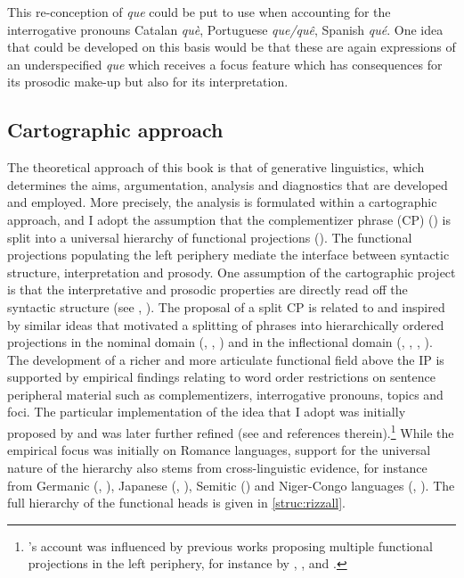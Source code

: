 This re-conception of \emph{que} could be put to use when accounting for the  interrogative pronouns Catalan \emph{què}, Portuguese \emph{que/quê}, Spanish \emph{qué}. One idea that could be developed on this basis would be that these are again expressions of an underspecified \emph{que} which receives a focus feature which has  consequences for its prosodic make-up  but also for its interpretation. 


\subsection{Cartographic approach}
\begin{sloppypar}
The theoretical approach of this book is that of generative linguistics, which determines the aims, argumentation, analysis and diagnostics that are developed and employed.  More precisely, the analysis is formulated within a cartographic approach, and  I adopt the assumption that the complementizer phrase (CP) (\citealt{Chomsky1986}) is split into a universal hierarchy of functional projections (\citealt{Rizzi1997}). The functional projections populating the left periphery mediate the interface between syntactic structure, interpretation and prosody. One assumption  of the cartographic project is that the interpretative and prosodic properties are directly read off the syntactic structure (see \citealt{Belletti2004}, \citealt{Bocci2009}). The proposal of a split CP is related to and inspired by similar ideas that motivated a splitting of phrases into hierarchically ordered projections  in the nominal  domain (\citealt{Abney1987}, \citealt{Cinque1994}, \citealt{Longobardi1996}) and in the inflectional domain (\citealt{Pollock1989}, \citealt{Belletti1990}, \citealt{Ouhalla1991}, \citealt{Cinque1999}). The  development of a richer and more articulate functional field above the IP is supported by empirical findings relating to word order restrictions on sentence peripheral material such as complementizers, interrogative pronouns, topics and foci.  The particular implementation of the idea that I adopt was initially proposed by \citet{Rizzi1997} and was later further refined (see \citealt{Rizzi2001,Rizzi2004a,Rizzi2013} and references therein).\footnote{\citeauthor{Rizzi1997}'s account was influenced by previous works proposing multiple functional projections in the left periphery,  for instance by \citet{Reinhart1981}, \citet{Uriagereka1988, Uriagereka1995},   \citet{Brody1990, Brody1995} and \citet{Culicover1992}.}
While the empirical focus was initially on Romance languages,  support for the universal nature of the hierarchy also stems  from cross-linguistic evidence, for instance from  Germanic (\citealt{Grewendorf2002}, \citealt{Haegeman2004,Haegeman2006,Haegeman2012}), Japanese (\citealt{Saito2012}, \citealt{Belletti2013}), Semitic (\citealt{Shlonsky2000, Shlonsky2014}) and Niger-Congo languages (\citealt{Aboh2004,Aboh2010}, \citealt{Torrence2013}).  
The full hierarchy of the functional heads is given in \eqref{struc:rizzall}.
\end{sloppypar}

